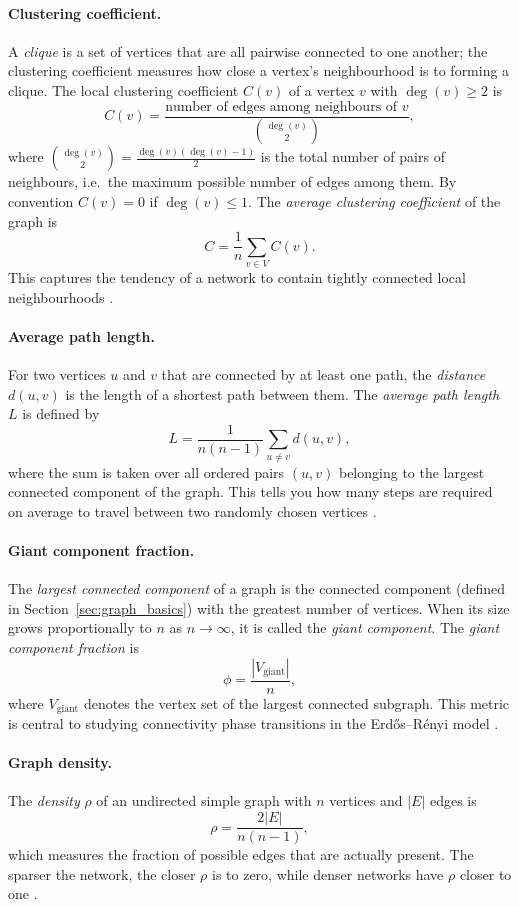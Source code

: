 \documentclass[12pt, a4paper]{report}
\theoremstyle{definition}
\theoremstyle{plain}
\theoremstyle{remark}
\begin{document}
\paragraph{Clustering coefficient.}
A \emph{clique} is a set of vertices that are all pairwise
connected to one another; the clustering coefficient measures
how close a vertex's neighbourhood is to forming a clique.
The local clustering coefficient $C(v)$ of a vertex 
$v$ with $\deg(v) \ge 2$ is
\[
  C(v) =
  \frac{\text{number of edges among neighbours of } v}
       {\binom{\deg(v)}{2}},
\]
where $\binom{\deg(v)}{2} = \frac{\deg(v)(\deg(v)-1)}{2}$ is
the total number of pairs of neighbours, i.e.\ the maximum
possible number of edges among them.
By convention $C(v) = 0$ if $\deg(v) \le 1$. The 
\emph{average clustering coefficient} of the graph is
\[
  C = \frac{1}{n} \sum_{v \in V} C(v).
\]
This captures the tendency of a network to contain 
tightly connected local neighbourhoods \cite{hofstad2017}.

\paragraph{Average path length.}
For two vertices $u$ and $v$ that are connected by at least one
path, the \emph{distance} $d(u,v)$ is the length of a shortest
path between them. The 
\emph{average path length} $L$ is defined by
\[
  L = \frac{1}{n(n-1)} \sum_{u \ne v} d(u,v),
\]
where the sum is taken over all ordered pairs $(u,v)$
belonging to the largest connected component of the graph. 
This tells you how many steps are required on average
to travel between two randomly chosen vertices
\cite{hofstad2017, albert2002}.

\paragraph{Giant component fraction.}
The \emph{largest connected component} of a graph is the
connected component (defined in Section~\ref{sec:graph_basics})
with the greatest number of vertices. When its size grows
proportionally to $n$ as $n \to \infty$, it is called the
\emph{giant component}. The \emph{giant component fraction} is
\[
  \phi = \frac{|V_{\text{giant}}|}{n},
\]
where $V_{\text{giant}}$ denotes the vertex set of the 
largest connected subgraph. This metric is central to 
studying connectivity phase transitions in the 
Erd\H{o}s--R\'enyi model \cite{hofstad2017}.

\paragraph{Graph density.}
The \emph{density} $\rho$ of an undirected simple graph 
with $n$ vertices and $|E|$ edges is
\[
  \rho = \frac{2|E|}{n(n-1)},
\]
which measures the fraction of possible edges that are 
actually present. The sparser the network, the closer $\rho$ 
is to zero, while denser networks have $\rho$ closer to one
\cite{hofstad2017}.
\end{document}
